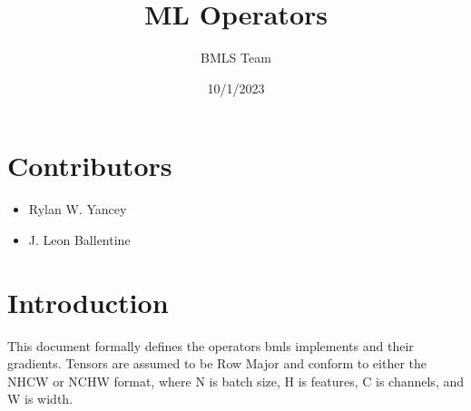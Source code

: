 \documentclass{article}
\title{ML Operators}
\author{BMLS Team}
\date{10/1/2023}
\begin{document}
    \maketitle
    \section*{Contributors}
        \begin{itemize}
            \item Rylan W. Yancey
            \item J. Leon Ballentine
        \end{itemize}
    \section*{Introduction}
        This document formally defines the operators bmls implements and their gradients. Tensors are assumed to be Row Major and conform to either
        the NHCW or NCHW format, where N is batch size, H is features, C is channels, and W is width. 

\noindent\makebox[\linewidth]{\rule{\paperwidth}{0.4pt}}
\end{document}
